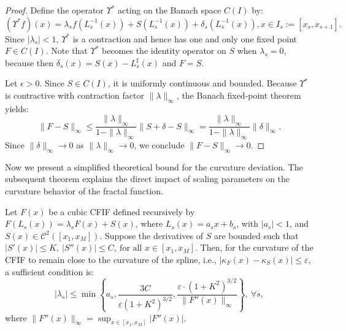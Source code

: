 \documentclass[runningheads]{llncs}
\begin{document}
	\begin{proof}
		Define the operator $ \Upsilon^* $ acting on the Banach space $ C(I) $ by:
		$$ (\Upsilon^*f)(x) = \lambda_s f(L_s^{-1}(x)) + S(L_s^{-1}(x)) + \delta_s(L_s^{-1}(x)), x \in I_s:= [x_s ,x_{s+1}]. $$
		Since $ |\lambda_s| < 1 $, $ \Upsilon^* $ is a contraction and hence has one and only one fixed point $ F \in C(I) $. Note that $ \Upsilon^* $ becomes the identity operator on $ S $ when $ \lambda_s = 0 $, because then $ \delta_s(x) = S(x) - L_s^\sharp(x) $ and $ F = S $.
		
		Let $ \epsilon > 0 $. Since $ S \in C(I) $, it is uniformly continuous and bounded. Because $ \Upsilon^* $ is contractive with contraction factor $ \|\lambda\|_\infty $, the Banach fixed-point theorem yields:
		$$ \|F - S\|_\infty \leq \frac{\|\lambda\|_\infty}{1 - \|\lambda\|_\infty} \|S + \delta - S\|_\infty = \frac{\|\lambda\|_\infty}{1 - \|\lambda\|_\infty} \|\delta\|_\infty. $$
		Since $ \|\delta\|_\infty \to 0 $ as $ \|\lambda\|_\infty \to 0 $, we conclude $ \|F - S\|_\infty \to 0 $.
	\end{proof}
	
	Now we present a simplified theoretical bound for the curvature deviation. The subsequent theorem explains the direct impact of scaling parameters on the curvature behavior of the fractal function.
	
	\begin{theorem}\label{theorem4}
		Let $ F(x) $ be a cubic CFIF defined recursively by $ F(L_s(x)) = \lambda_s F(x) + S(x)$, where $ L_s(x) = a_s x + b_s $, with $ |a_s| < 1 $, and $ S(x) \in \mathcal{C}^2([x_1, x_M]) $. Suppose the derivatives of $ S $ are bounded such that $ |S'(x)| \leq K,\ |S''(x)| \leq C, \ \text{for all } x \in [x_1, x_M]$. Then, for the curvature of the CFIF to remain close to the curvature of the spline, i.e., $ |\kappa_F(x) - \kappa_S(x)| \leq \varepsilon$, a sufficient condition is:
		$$ |\lambda_s| \leq \min \left\{a_s, \frac{3C}{\varepsilon (1 + K^2)^{3/2}}, \frac{\varepsilon \cdot (1 + K^2)^{3/2}}{\|F''(x)\|_\infty}\right\}, \ \forall s,$$ where $ \|F''(x)\|_\infty = \sup_{x \in [x_1, x_M]} |F''(x)| $.
	\end{theorem}
	
\end{document}
